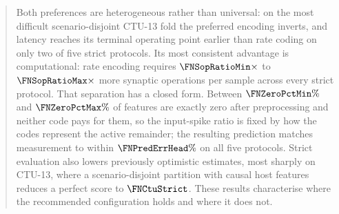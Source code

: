 \begin{abstract}
Both preferences are heterogeneous rather than universal: on the most difficult
scenario-disjoint CTU-13 fold the preferred encoding inverts, and latency
reaches its terminal operating point earlier than rate coding on only two of
five strict protocols. Its most consistent advantage is computational: rate
encoding requires $\FNSopRatioMin\times$ to $\FNSopRatioMax\times$ more synaptic
operations per sample across every strict protocol. That separation has a closed
form. Between $\FNZeroPctMin\%$ and $\FNZeroPctMax\%$ of features are exactly
zero after preprocessing and neither code pays for them, so the input-spike
ratio is fixed by how the codes represent the active remainder; the resulting
prediction matches measurement to within $\FNPredErrHead\%$ on all five
protocols. Strict evaluation also
lowers previously optimistic estimates, most sharply on CTU-13, where a
scenario-disjoint partition with causal host features reduces a perfect score to
$\FNCtuStrict$. These results characterise where the recommended configuration
holds and where it does not.
\end{abstract}

